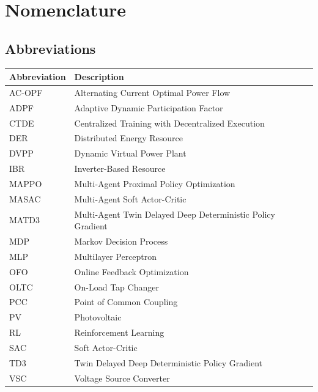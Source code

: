 \chapter*{Nomenclature}

\section*{Abbreviations}
\noindent
\begin{tabularx}{\textwidth}{@{}l X@{}}
\toprule
\textbf{Abbreviation} & \textbf{Description} \\
\midrule
AC-OPF & Alternating Current Optimal Power Flow \\
ADPF   & Adaptive Dynamic Participation Factor \\
CTDE   & Centralized Training with Decentralized Execution \\
DER    & Distributed Energy Resource \\
DVPP   & Dynamic Virtual Power Plant \\
IBR    & Inverter-Based Resource \\
MAPPO  & Multi-Agent Proximal Policy Optimization \\
MASAC  & Multi-Agent Soft Actor-Critic \\
MATD3  & Multi-Agent Twin Delayed Deep Deterministic Policy Gradient \\
MDP    & Markov Decision Process \\
MLP    & Multilayer Perceptron \\
OFO    & Online Feedback Optimization \\
OLTC   & On-Load Tap Changer \\
PCC    & Point of Common Coupling \\
PV     & Photovoltaic \\
RL     & Reinforcement Learning \\
SAC    & Soft Actor-Critic \\
TD3    & Twin Delayed Deep Deterministic Policy Gradient \\
VSC    & Voltage Source Converter \\
\bottomrule
\end{tabularx}

\vspace{1.5em}

